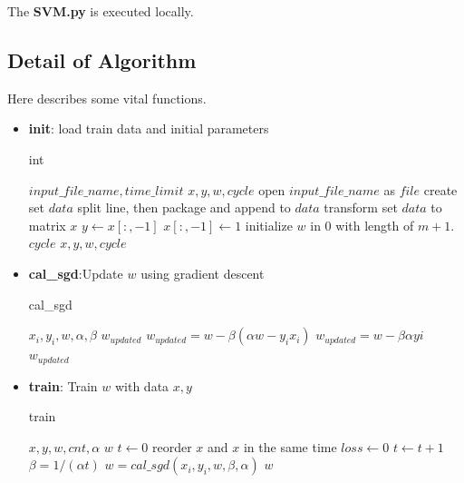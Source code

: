 \documentclass[conference,compsoc]{IEEEtran}
\renewcommand{\algorithmicrequire}{\textbf{Input:}}
\renewcommand{\algorithmicensure}{\textbf{Output:}}
\begin{document}
The \textbf{SVM.py} is executed locally.

\subsection{Detail of Algorithm}
Here describes some vital functions.
\begin{itemize}
    \item \textbf{init}: load train data and initial parameters
    \begin{algorithm}[H]
     \caption{int}
     \begin{algorithmic}[1]
     \renewcommand{\algorithmicrequire}{\textbf{Input:}}
     \renewcommand{\algorithmicensure}{\textbf{Output:}}
     \REQUIRE $input\_file\_name, time\_limit$
     \ENSURE $x, y, w, cycle$
     \STATE open $input\_file\_name$ as $file$
     \STATE create set $data$
          \STATE split line, then package and append to $data$
     \ENDFOR
     \STATE transform set $data$ to matrix $x$
     \STATE $y \leftarrow x[:,-1]$ 
     \STATE $x[:, -1] \leftarrow 1$
     \STATE initialize $w$ in 0 with length of $m+1$. 
     \STATE $cycle$
     \RETURN $x, y, w, cycle$
     \end{algorithmic}
   \end{algorithm}

   \item \textbf{cal\_sgd}:Update $w$ using gradient descent
     \begin{algorithm}[H]
     \caption{cal\_sgd}
     \begin{algorithmic}[2]
     \renewcommand{\algorithmicrequire}{\textbf{Input:}}
     \renewcommand{\algorithmicensure}{\textbf{Output:}}
     \REQUIRE $x_i, y_i, w, \alpha, \beta$
     \ENSURE $w_{updated}$ 
	     \STATE $w_{updated} = w - \beta(\alpha w - y_ix_i)$
     \ELSE
	     \STATE $w_{updated} = w - \beta\alpha yi$
     \ENDIF
     \RETURN $w_{updated}$
     \end{algorithmic}
     \end{algorithm}

  \item \textbf{train}: Train $w$ with data $x, y$
    \begin{algorithm}[H]
     \caption{train}
     \begin{algorithmic}[3]
     \renewcommand{\algorithmicrequire}{\textbf{Input:}}
     \renewcommand{\algorithmicensure}{\textbf{Output:}}
     \REQUIRE $x, y, w, cnt, \alpha$
     \ENSURE  $w$
     \STATE $t \leftarrow 0$
	     \STATE reorder $x$ and $x$ in the same time
	     \STATE $loss \leftarrow 0$ 
	     \STATE $t \leftarrow t+1$
	     \STATE $\beta = 1/(\alpha t)$
		  \STATE $w = cal\_sgd(x_i, y_i, w, \beta, \alpha)$
	     \ENDFOR
     \ENDWHILE
     \RETURN $w$
     \end{algorithmic}
     \end{algorithm}
 

\end{itemize}
\end{document}
